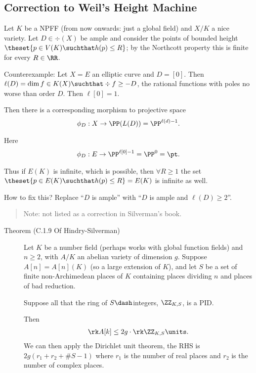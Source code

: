 \hypertarget{correction-to-weils-height-machine}{%
\subsection{Correction to Weil's Height
Machine}\label{correction-to-weils-height-machine}}

Let \(K\) be a NPFF (from now onwards: just a global field) and \(X/K\)
a nice variety. Let \(D\in \div(X)\) be ample and consider the points of
bounded height \(\theset{ p\in V(K) \suchthat h(p) \leq R }\); by the
Northcott property this is finite for every \(R \in \RR\).

Counterexample: Let \(X = E\) an elliptic curve and \(D = [0]\). Then
\(\ell(D) = \dim{f\in K(X) \suchthat \div f\geq -D}\), the rational
functions with poles no worse than order \(D\). Then \(\ell[0] = 1\).

Then there is a corresponding morphism to projective space
\begin{align*}
\phi_D: X \to \PP(L(D)) = \PP^{\ell(d) - 1}
.\end{align*}

Here
\begin{align*}
\phi_D: E \to \PP^{\ell[0] - 1} = \PP^0 = \pt
.\end{align*}

Thus if \(E(K)\) is infinite, which is possible, then
\(\forall R\geq 1\) the set
\(\theset{p\in E(K) \suchthat h(p) \leq R} = E(K)\) is infinite as well.

How to fix this? Replace ``\(D\) is ample'' with ``\(D\) is ample and
\(\ell(D) \geq 2\)''.

\begin{quote}
Note: not listed as a correction in Silverman's book.
\end{quote}

\begin{description}
\item[Theorem (C.1.9 Of Hindry-Silverman)]
Let \(K\) be a number field (perhaps works with global function fields)
and \(n\geq 2\), with \(A/K\) an abelian variety of dimension \(g\).
Suppose \(A[n] = A[n](K)\) (so a large extension of \(K\)), and let
\(S\) be a set of finite non-Archimedean places of \(K\) containing
places dividing \(n\) and places of bad reduction.

Suppose all that the ring of \(S\dash\)integers, \(\ZZ_{K, S}\), is a
PID.

Then
\begin{align*}
\rk A[k] \leq 2g \cdot \rk \ZZ_{K, S}\units
.\end{align*} We can then apply the Dirichlet unit theorem, the RHS is
\(2g(r_1 + r_2 + \# S - 1)\) where \(r_1\) is the number of real places
and \(r_2\) is the number of complex places.
\end{description}


